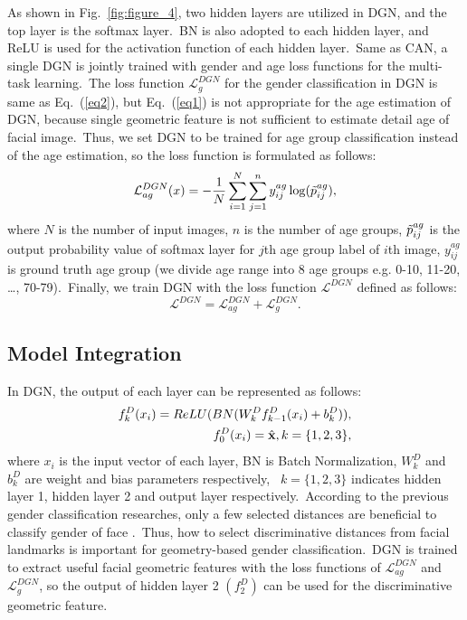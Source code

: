 \documentclass[10pt,twocolumn,letterpaper]{article}
\begin{document}
As shown in Fig.~\ref{fig:figure_4}, two hidden layers are utilized in DGN, and the top layer is the softmax layer.~BN is also adopted to each hidden layer, and ReLU is used for the activation function of each hidden layer.~Same as CAN, a single DGN is jointly trained with gender and age loss functions for the multi-task learning.~The loss function $\mathcal{L}_g^{DGN}$ for the gender classification in DGN is same as Eq.~(\ref{eq2}), but Eq.~(\ref{eq1}) is not appropriate for the age estimation of DGN, because single geometric feature is not sufficient to estimate detail age of facial image.~Thus, we set DGN to be trained for age group classification instead of the age estimation, so the loss function is formulated as follows:
\begin{equation}
\label{eq6}
    \mathcal{L}_{ag}^{DGN}(x)=-\frac{1}{N}\sum_{i=1}^N\sum_{j=1}^ny_{ij}^{ag}\log(\Tilde{p}^{ag}_{ij}),
\end{equation}
where $N$ is the number of input images, $n$ is the number of age groups, $\Tilde{p}^{ag}_{ij}$ is the output probability value of softmax layer for $j$th age group label of $i$th image, $y_{ij}^{ag}$ is ground truth age group (we divide age range into 8 age groups e.g. 0-10, 11-20, \ldots, 70-79).~Finally, we train DGN with the loss function $\mathcal{L}^{DGN}$ defined as follows:
\begin{equation}
\label{loss_DGN}
    \mathcal{L}^{DGN}=\mathcal{L}_{ag}^{DGN}+\mathcal{L}_g^{DGN}.
\end{equation}


\subsection{Model Integration}
\label{model integration}
In DGN, the output of each layer can be represented as follows:
\begin{align}
\label{eq7}
    f_k^D(x_i)=ReLU(BN(W_k^Df_{k-1}^D(x_i)+b_k^D)),\nonumber\\ f_0^D(x_i)=\Hat{\mathbf{x}}, k=\{1,2,3\},
\end{align}
where $x_i$ is the input vector of each layer, BN is Batch Normalization, $W_k^D$ and $b_k^D$ are weight and bias parameters respectively, ~$k=\{1,2,3\}$ indicates hidden layer 1, hidden layer 2 and output layer respectively.~According to the previous gender classification researches, only a few selected distances are beneficial to classify gender of face \cite{Xu2008}.~Thus, how to select discriminative distances from facial landmarks is important for geometry-based gender classification.~DGN is trained to extract useful facial geometric features with the loss functions of $\mathcal{L}_{ag}^{DGN}$ and $\mathcal{L}_g^{DGN}$, so the output of hidden layer 2 $(f_2^D)$ can be used for the discriminative geometric feature.
\end{document}
